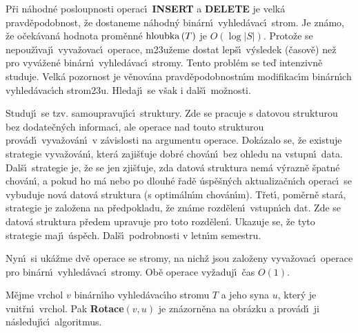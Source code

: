 \flushpar P\v ri n\'ahodn\'e posloupnosti operac\'\i\ {\bf INSERT} a {\bf DELETE} je 
velk\'a pravd\v epodobnost, \v ze dostaneme n\'ahodn\'y bin\'arn\'\i\ 
vy\-hled\'avac\'\i\ strom.  Je zn\'amo, \v ze o\v cek\'avan\'a hodnota prom\v en\-n\'e 
$\operatorname{hloubka}\left(T\right)$ je $O\left(\log|S|\right)$.  Proto\v ze se nepou\v z\'\i vaj\'\i\ vyva\v zovac\'\i\ 
operace, m\accent23u\v zeme dostat lep\v s\'\i\ v\'ysledek (\v casov\v e) ne\v z pro 
vyv\'a\-\v zen\'e bin\'ar\-n\'\i\ vyhled\'avac\'\i\ stromy.  Tento probl\'em se te\v d 
intenzivn\v e studu\-je.  Velk\'a pozornost je v\v enov\'ana 
pravd\v epodobnost\-n\'\i m modifikac\'\i m bin\'arn\'\i ch vyhled\'avac\'\i ch 
strom\accent23u.  Hledaj\'\i\ se v\v sak i dal\v s\'\i\ mo\v znosti.  
\medskip

\flushpar Studuj\'\i\ se tzv.  samoupravuj\'\i c\'\i\ struktury.  Zde se 
pracuje s datovou strukturou bez dodate\v cn\'ych informac\'\i , ale 
operace nad touto strukturou prov\'ad\'\i\ vyva\v zov\'an\'\i\ v z\'avislosti 
na argumentu operace.  Dok\'azalo se, \v ze existuje strategie 
vyva\v zov\'an\'\i , kter\'a zaji\v s\v tuje dobr\'e chov\'an\'\i\ bez ohledu na 
vstupn\'\i\ data.  Dal\v s\'\i\ strategie je, \v ze se jen zji\v s\v tuje, zda datov\'a 
struktura nem\'a v\'yraz\-n\v e \v spatn\'e chov\'an\'\i , a pokud ho m\'a nebo 
po dlouh\'e \v rad\v e \'usp\v e\v s\-n\'ych aktualiza\v cn\'\i ch operac\'\i\ se vybuduje 
nov\'a datov\'a struktura (s optim\'aln\'\i m chov\'an\'\i m).  T\v ret\'\i , 
pom\v ern\v e star\'a, strategie je zalo\-\v ze\-na na p\v redpokladu, \v ze 
zn\'ame rozd\v elen\'\i\ vstupn\'\i ch dat.  Zde se datov\'a struktura 
p\v redem upravuje pro toto rozd\v elen\'\i .  Ukazuje se, \v ze tyto 
strategie maj\'\i\ \'usp\v ech.  Dal\v s\'\i\ podrobnosti v letn\'\i m semestru.  
\medskip

\flushpar Nyn\'\i\ si uk\'a\v zme dv\v e operace se stromy, na nich\v z jsou 
zalo\v zeny  vyva\v zovac\'\i\ operace pro bin\'arn\'\i\ vyhled\'avac\'\i\ 
stromy. Ob\v e ope\-race vy\v zaduj\'\i\ \v cas $O\left(1\right)$.
\medskip

\flushpar M\v ejme vrchol $v$ bin\'arn\'\i ho vyhled\'avac\'\i ho stromu $
T$ a 
jeho syna $u$, kter\'y je vnit\v rn\'\i\ vrchol.  Pak {\bf Rotace$
\left(v,u\right)$} je 
zn\'azorn\v ena na obr\'azku a prov\'ad\'\i\ ji n\'asleduj\'\i c\'\i\ algoritmus.  
\bigskip

\midinsert
\centerline{}
\endcaption
\endinsert
\medskip

